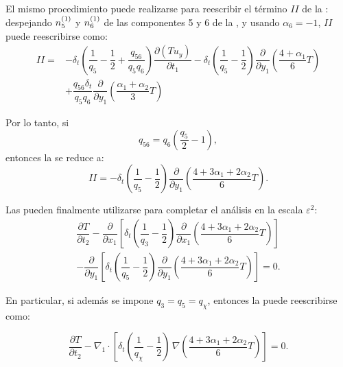 El mismo procedimiento puede realizarse para reescribir el término $II$ de la : despejando $n_{5}^{(1)}$ y $n_{6}^{(1)}$ de las componentes 5 y 6 de la , y usando $\alpha_6=-1$, $II$ puede reescribirse como:
\begin{equation}
\begin{aligned}
	II =& -\delta_t \left( \dfrac{1}{q_5} - \dfrac{1}{2}  + \dfrac{q_{56}}{q_5 q_6}  \right) \dfrac{\partial (Tu_y)}{\partial t_1} - \delta_t \left( \dfrac{1}{q_5} - \dfrac{1}{2} \right) \dfrac{\partial}{\partial y_1} \left(\dfrac{4+\alpha_1}{6} T \right) \\
	&+ \dfrac{q_{56}\delta_t}{q_5q_6}\dfrac{\partial}{\partial y_1} \left(\dfrac{\alpha_1+\alpha_2}{3} T \right)
	\label{eq:II_0}
\end{aligned}
\end{equation}


Por lo tanto, si 
\begin{equation}
	q_{56} = q_6 \left( \dfrac{q_5}{2} - 1 \right),
\end{equation}
entonces la  se reduce a:
\begin{equation}
	II = -\delta_t \left( \dfrac{1}{q_5} - \dfrac{1}{2} \right) \dfrac{\partial}{\partial y_1} \left(\dfrac{4+3\alpha_1 + 2\alpha_2}{6} T \right).
	\label{eq:II_1}
\end{equation}

Las  pueden finalmente utilizarse para completar el an\'alisis en la escala $\varepsilon^2$:
\begin{equation}
	\begin{split}
	\dfrac{\partial T}{\partial t_2} -
	\dfrac{\partial}{\partial x_1}\left[ \delta_t \left( \dfrac{1}{q_3} - \dfrac{1}{2} \right) \dfrac{\partial}{\partial x_1} \left(\dfrac{4+3\alpha_1 + 2\alpha_2}{6} T \right) \right]	\\
	-  \dfrac{\partial}{\partial y_1}\left[ \delta_t \left( \dfrac{1}{q_5} - \dfrac{1}{2} \right) \dfrac{\partial}{\partial y_1} \left(\dfrac{4+3\alpha_1 + 2\alpha_2}{6} T \right) \right] = 0.
	\end{split}
	\label{eq:eps_2_clean}
\end{equation}

En particular, si adem\'as se impone $q_3=q_5=q_{\chi}$, entonces la  puede reescribirse como:

\begin{equation}
	\dfrac{\partial T}{\partial t_2} - \nabla_1 \cdot \left[ \delta_t \left( \dfrac{1}{q_{\chi}} - \dfrac{1}{2} \right) \, \nabla\left( \dfrac{4+3\alpha_1 + 2\alpha_2}{6} T \right) \right]  = 0.
	\label{eq:T_eps_2}
\end{equation}

